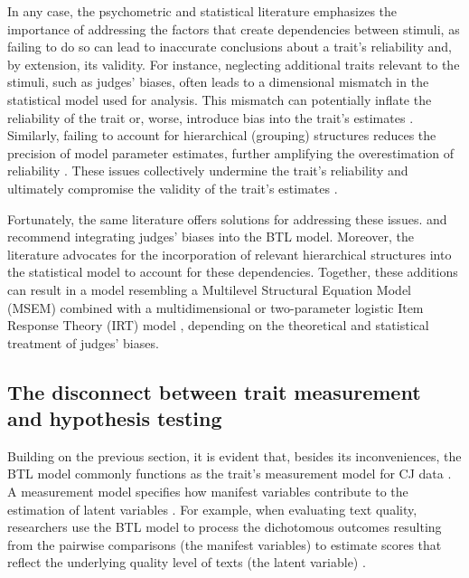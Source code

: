 \documentclass[
  authoryear,
  preprint,
  1p]{elsarticle}
\begin{document}
In any case, the psychometric and statistical literature emphasizes the
importance of addressing the factors that create dependencies between
stimuli, as failing to do so can lead to inaccurate conclusions about a
trait's reliability and, by extension, its validity. For instance,
neglecting additional traits relevant to the stimuli, such as judges'
biases, often leads to a dimensional mismatch in the statistical model
used for analysis. This mismatch can potentially inflate the reliability
of the trait \citep[pp.~341]{Hoyle_et_al_2023} or, worse, introduce bias
into the trait's estimates \citep{Ackerman_1989}. Similarly, failing to
account for hierarchical (grouping) structures reduces the precision of
model parameter estimates, further amplifying the overestimation of
reliability \citep[pp.~482]{Hoyle_et_al_2023}. These issues collectively
undermine the trait's reliability and ultimately compromise the validity
of the trait's estimates \citep[pp.~2]{Perron_et_al_2015}.

Fortunately, the same literature offers solutions for addressing these
issues. \citet{Andrich_1978} and \citet{Wainer_et_al_1978} recommend
integrating judges' biases into the BTL model. Moreover, the literature
advocates for the incorporation of relevant hierarchical structures into
the statistical model to account for these dependencies. Together, these
additions can result in a model resembling a Multilevel Structural
Equation Model (MSEM) \citep[chap.~26]{Hoyle_et_al_2023} combined with a
multidimensional or two-parameter logistic Item Response Theory (IRT)
model \citep[chap.~15]{Hoyle_et_al_2023}, depending on the theoretical
and statistical treatment of judges' biases.

\subsection{The disconnect between trait measurement and hypothesis
testing}\label{sec-theory-issue2}

Building on the previous section, it is evident that, besides its
inconveniences, the BTL model commonly functions as the trait's
measurement model for CJ data \citep{Andrich_1978, Bramley_2008}. A
measurement model specifies how manifest variables contribute to the
estimation of latent variables \citep{Everitt_et_al_2010}. For example,
when evaluating text quality, researchers use the BTL model to process
the dichotomous outcomes resulting from the pairwise comparisons (the
manifest variables) to estimate scores that reflect the underlying
quality level of texts (the latent variable)
\citep{Laming_2004, Pollitt_2012b, Whitehouse_2012, vanDaal_et_al_2016, Lesterhuis_2018_thesis, Coertjens_et_al_2017, Goossens_et_al_2018, Bouwer_et_al_2023}.
\end{document}
